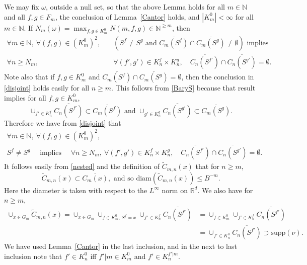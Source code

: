 \documentclass[12pt]{article}
\makeatletter
\renewenvironment{proof}[1][\proofname]{%
\par\pushQED{\qed}\normalfont%
\topsep6\p@\@plus6\p@\relax
\trivlist\item[\hskip\labelsep\bfseries#1\@addpunct{.}]%
\ignorespaces
}{%
\popQED\endtrivlist\@endpefalse
}
\numberwithin{theorem}{section}
\theoremstyle{def}
\numberwithin{equation}{section}
\newcommand{\R}{\mathbb{R}}
\newcommand{\N}{\mathbb{N}}
\newcommand{\supp}{\mathrm{supp}}
\newcommand{\diam}{\mathrm{diam}}
\makeatother
\begin{document}
\begin{proof}[Proof of Theorem~\ref{thm:totdisc}]
We may fix $\omega$, outside a null set, so that the above Lemma holds for all $m\in\N$ and all $f,g\in F_m$, the conclusion of Lemma~\ref{Cantor} holds, and $|K^0_m|<\infty$ for all $m\in\N$. If $N_m(\omega)=\max_{f,g\in K^0_m}N(m,f,g)\in \N^{\ge m}$, then 
\begin{align}\label{disjoint}
\nonumber\forall m\in\N, \ \forall (f,g)\in (K_m^0)^2,\quad &\left(S^f\neq S^g \text{ and }\overline{C_m(S^f)}\cap\overline{C_m(S^g)}\neq\emptyset\right) \text{ implies }\\ 
\forall n\ge N_m, \
&\forall(f',g')\in K_n^f\times K_n^g, \quad  \overline{C_n(S^{f'})}\cap\overline{C_n(S^{g'})}=\emptyset.
\end{align}
Note also that if $f,g\in K^0_m$ and $\overline{C_m(S^f)}\cap\overline{C_m(S^g)}=\emptyset$, then the conclusion in \eqref{disjoint} holds easily for all $n\ge m$.  This follows from \eqref{BaryS} because that result implies for all $f,g\in K^0_m$, 
\begin{equation}\label{nested}
\cup_{f'\in K_n^f}\overline{C_n(S^{f'})}\subset \overline{C_m(S^f)}\text{ and }\cup_{g'\in K_n^{g}}\overline{C_n(S^{g'})}\subset \overline{C_m(S^g)}.
\end{equation}
Therefore we have from \eqref{disjoint} that
\begin{multline}\label{disjoint2}
\forall m\in\N, \  \forall (f,g)\in (K_m^0)^2, \\
S^f\neq S^g \quad \text{ implies } \quad  \forall n\ge N_m, \ \forall (f',g')\in K_n^f\times K_n^g, \quad  \overline{C_n(S^{f'})}\cap\overline{C_n(S^{g'})}=\emptyset.
\end{multline}
It follows easily from \eqref{nested} and the definition of $\widetilde C_{m,n}(x)$ that for $n\ge m$,
\begin{equation}\label{diam}
\widetilde C_{m,n}(x)\subset\overline{C_m(x)},\text{ and so }\diam(\widetilde C_{m,n}(x))\le B^{-m}.
\end{equation}
Here the diameter is taken with respect to the $L^\infty$ norm on $\R^d$.  We also have for $n\ge m$, 
\begin{align}\label{suppnudiscn}\nonumber\cup_{x\in G_m}\widetilde C_{m,n}(x)=\cup_{x\in G_m}\cup_{f\in K^0_m,\,S^f=x}\cup_{f'\in K^f_n}\overline{C_n(S^{f'})}&=\cup_{f\in K^0_m}\cup_{f'\in K^f_n}\overline{C_n(S^{f'})}\\
&=\cup_{f'\in K_n^0}\overline{C_n(S^{f'})}\supset\supp(\nu).
\end{align}
We have used Lemma~\ref{Cantor} in the last inclusion, and in the next to last inclusion note that $f'\in K^0_n$ iff $f'|m\in K^0_m$ and $f'\in K_n^{f'|m}$. 


\end{proof}
\end{document}
